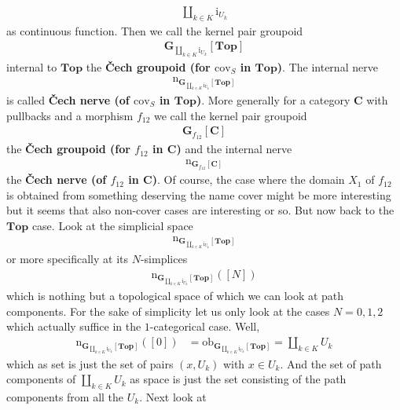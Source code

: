 \begin{align*}
  \coprod_{k \in K}
  \mathrm{i}_{U_{k}}
\end{align*}
as continuous function. Then we call the kernel pair groupoid
\begin{align*}
  \mathbf{G}_{\coprod_{k \in K}\mathrm{i}_{U_{k}}}[\mathbf{Top}]
\end{align*}
internal to $\mathbf{Top}$ the \textbf{\v{C}ech groupoid (for $\mathrm{cov}_{S}$ in $\mathbf{Top}$)}. The internal nerve
\begin{align*}
  \mathrm{n}_{\mathbf{G}_{\coprod_{k \in K}\mathrm{i}_{U_{k}}}[\mathbf{Top}]}
\end{align*}
is called \textbf{\v{C}ech nerve (of $\mathrm{cov}_{S}$ in $\mathbf{Top}$)}. More generally for a category $\mathbf{C}$ with pullbacks and a morphism $f_{12}$ we call the kernel pair groupoid
\begin{align*}
  \mathbf{G}_{f_{12}}[\mathbf{C}]
\end{align*}
the \textbf{\v{C}ech groupoid (for $f_{12}$ in $\mathbf{C}$)} and the internal nerve
\begin{align*}
  \mathrm{n}_{\mathbf{G}_{f_{12}}[\mathbf{C}]}
\end{align*}
the \textbf{\v{C}ech nerve (of $f_{12}$ in $\mathbf{C}$)}. Of course, the case where the domain $X_{1}$ of $f_{12}$ is obtained from something deserving the name {\glqq}cover{\grqq} might be more interesting but it seems that also non-cover cases are interesting or so. But now back to the $\mathbf{Top}$ case. Look at the simplicial space
\begin{align*}
  \mathrm{n}_{\mathbf{G}_{\coprod_{k \in K}\mathrm{i}_{U_{k}}}[\mathbf{Top}]}
\end{align*}
or more specifically at its $N$-simplices
\begin{align*}
  \mathrm{n}_{\mathbf{G}_{\coprod_{k \in K}\mathrm{i}_{U_{k}}}[\mathbf{Top}]}
  ([N])
\end{align*}
which is nothing but a topological space of which we can look at path components. For the sake of simplicity let us only look at the cases $N = 0,1,2$ which actually suffice in the $1$-categorical case. Well,
\begin{align*}
  \mathrm{n}_{\mathbf{G}_{\coprod_{k \in K}\mathrm{i}_{U_{k}}}[\mathbf{Top}]}
  ([0])
  &=
  \mathrm{ob}_{\mathbf{G}_{\coprod_{k \in K}\mathrm{i}_{U_{k}}}[\mathbf{Top}]}
  =
  \coprod_{k \in K}
  U_{k}
\end{align*}
which as set is just the set of pairs $(x,U_{k})$ with $x \in U_{k}$. And the set of path components of $\coprod_{k \in K} U_{k}$ as space is just the set consisting of the path components from all the $U_{k}$. Next look at
